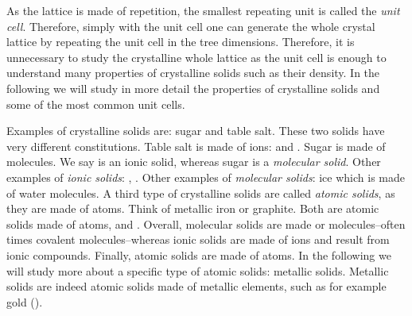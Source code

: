 \documentclass[main.tex]{subfiles}
\newcommand\chapterlabel{solids}
\begin{document}
\begin{description}
\begin{center}
\begin{tikzpicture}
\end{tikzpicture}\end{center}




As the lattice is made of repetition, the smallest repeating unit is called the \emph{unit cell}. Therefore, simply with the unit cell one can generate the whole crystal lattice by repeating the unit cell in the tree dimensions. Therefore, it is unnecessary to study the crystalline whole lattice  as the unit cell is enough to understand many properties of crystalline solids such as their density. In the following we will study in more detail the properties of crystalline solids and some of the most common unit cells.
\item[\docfilehook{Types of crystalline solids}{}] Examples of crystalline solids are: sugar and table salt. These two solids have very different constitutions. Table salt is made of ions:  and . Sugar is made of molecules. We say  is an ionic solid, whereas sugar is a \emph{molecular solid}. Other examples of \emph{ionic solids}: , . Other examples of \emph{molecular solids}: ice which is made of water molecules. A third type of crystalline solids are called \emph{atomic solids}, as they are made of atoms. Think of metallic iron or graphite. Both are atomic solids made of atoms,  and . Overall, molecular solids are made or molecules--often times covalent molecules--whereas ionic solids are made of ions and result from ionic compounds. Finally, atomic solids are made of atoms. In the following we will study more about a specific type of atomic solids: metallic solids. Metallic solids are indeed atomic solids made of metallic elements, such as for example gold ().
     \label{Fig:{\chapterlabel}\thefigurenewcounter}
     \begin{center}
     

\end{center}
\end{description}
\end{document}
